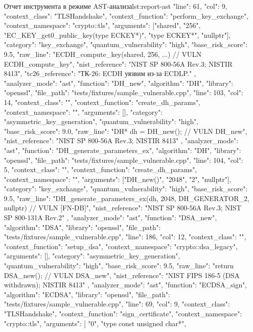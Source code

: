 \documentclass{itmo-vkr}
\begin{document}
\begin{itmolisting}[JSON]{Отчет инструмента в режиме AST-анализа}{lst:report-ast}
{{			"line": 61,
			"col": 9,
			"context_class": "TLSHandshake",
			"context_function": "perform_key_exchange",
			"context_namespace": "crypto::tls",
			"arguments": ["shared", "256", "EC_KEY_get0_public_key(type ECKEY*)", "type ECKEY*", "nullptr"],
			"category": "key_exchange",
			"quantum_vulnerability": "high",
			"base_risk_score": 9.5,
			"raw_line": "ECDH_compute_key(shared, 256, ...) // VULN ECDH_compute_key",
			"nist_reference": "NIST SP 800-56A Rev.3; NISTIR 8413",
			"tc26_reference": "ТК-26: ECDH уязвим из-за ECDLP."
		},
		{
			"analyzer_mode": "ast",
			"function": "DH_new",
			"algorithm": "DH",
			"library": "openssl",
			"file_path": "tests/fixtures/sample_vulnerable.cpp",
			"line": 103,
			"col": 14,
			"context_class": "",
			"context_function": "create_dh_params",
			"context_namespace": "",
			"arguments": [],
			"category": "asymmetric_key_generation",
			"quantum_vulnerability": "high",
			"base_risk_score": 9.0,
			"raw_line": "DH* dh = DH_new(); // VULN DH_new",
			"nist_reference": "NIST SP 800-56A Rev.3; NISTIR 8413"
		},
		{
			"analyzer_mode": "ast",
			"function": "DH_generate_parameters_ex",
			"algorithm": "DH",
			"library": "openssl",
			"file_path": "tests/fixtures/sample_vulnerable.cpp",
			"line": 104,
			"col": 5,
			"context_class": "",
			"context_function": "create_dh_params",
			"context_namespace": "",
			"arguments": ["DH_new()", "2048", "2", "nullptr"],
			"category": "key_exchange",
			"quantum_vulnerability": "high",
			"base_risk_score": 9.5,
			"raw_line": "DH_generate_parameters_ex(dh, 2048, DH_GENERATOR_2, nullptr) // VULN [FN-DB]",
			"nist_reference": "NIST SP 800-56A Rev.3; NIST SP 800-131A Rev.2"
		},
		{
			"analyzer_mode": "ast",
			"function": "DSA_new",
			"algorithm": "DSA",
			"library": "openssl",
			"file_path": "tests/fixtures/sample_vulnerable.cpp",
			"line": 186,
			"col": 12,
			"context_class": "",
			"context_function": "setup_dsa",
			"context_namespace": "crypto::dsa_legacy",
			"arguments": [],
			"category": "asymmetric_key_generation",
			"quantum_vulnerability": "high",
			"base_risk_score": 9.5,
			"raw_line": "return DSA_new(); // VULN DSA_new",
			"nist_reference": "NIST FIPS 186-5 (DSA withdrawn); NISTIR 8413"
		},
		{
			"analyzer_mode": "ast",
			"function": "ECDSA_sign",
			"algorithm": "ECDSA",
			"library": "openssl",
			"file_path": "tests/fixtures/sample_vulnerable.cpp",
			"line": 69,
			"col": 9,
			"context_class": "TLSHandshake",
			"context_function": "sign_certificate",
			"context_namespace": "crypto::tls",
			"arguments": [
			"0",
			"type const unsigned char*",
}}
\end{itmolisting}
\end{document}
